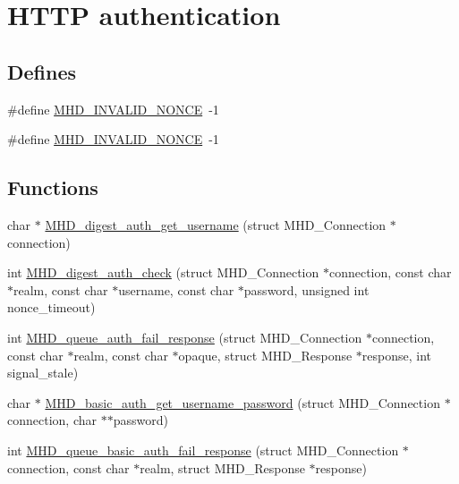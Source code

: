 \hypertarget{group__authentication}{\section{\-H\-T\-T\-P authentication}
\label{group__authentication}
}
\subsection*{\-Defines}
\begin{DoxyCompactItemize}
\item 
\#define \hyperlink{group__authentication_gac8deda2486d44f93a9b3c39d16ba8886}{\-M\-H\-D\-\_\-\-I\-N\-V\-A\-L\-I\-D\-\_\-\-N\-O\-N\-C\-E}~-\/1
\item 
\#define \hyperlink{group__authentication_gac8deda2486d44f93a9b3c39d16ba8886}{\-M\-H\-D\-\_\-\-I\-N\-V\-A\-L\-I\-D\-\_\-\-N\-O\-N\-C\-E}~-\/1
\end{DoxyCompactItemize}
\subsection*{\-Functions}
\begin{DoxyCompactItemize}
\item 
char $\ast$ \hyperlink{group__authentication_ga4fa3834833e37ec4b52e57bb55a00c27}{\-M\-H\-D\-\_\-digest\-\_\-auth\-\_\-get\-\_\-username} (struct \-M\-H\-D\-\_\-\-Connection $\ast$connection)
\item 
int \hyperlink{group__authentication_ga884dd2ba2e4a82f9b6584e8a8a111046}{\-M\-H\-D\-\_\-digest\-\_\-auth\-\_\-check} (struct \-M\-H\-D\-\_\-\-Connection $\ast$connection, const char $\ast$realm, const char $\ast$username, const char $\ast$password, unsigned int nonce\-\_\-timeout)
\item 
int \hyperlink{group__authentication_gababd5733dd1c21de5c099ad1d9c3c418}{\-M\-H\-D\-\_\-queue\-\_\-auth\-\_\-fail\-\_\-response} (struct \-M\-H\-D\-\_\-\-Connection $\ast$connection, const char $\ast$realm, const char $\ast$opaque, struct \-M\-H\-D\-\_\-\-Response $\ast$response, int signal\-\_\-stale)
\item 
char $\ast$ \hyperlink{group__authentication_gabd1e3fa0e5a5b54f6127c50a0d509190}{\-M\-H\-D\-\_\-basic\-\_\-auth\-\_\-get\-\_\-username\-\_\-password} (struct \-M\-H\-D\-\_\-\-Connection $\ast$connection, char $\ast$$\ast$password)
\item 
int \hyperlink{group__authentication_ga3deb764f416186b9b5868d5bce13305c}{\-M\-H\-D\-\_\-queue\-\_\-basic\-\_\-auth\-\_\-fail\-\_\-response} (struct \-M\-H\-D\-\_\-\-Connection $\ast$connection, const char $\ast$realm, struct \-M\-H\-D\-\_\-\-Response $\ast$response)
\end{DoxyCompactItemize}


